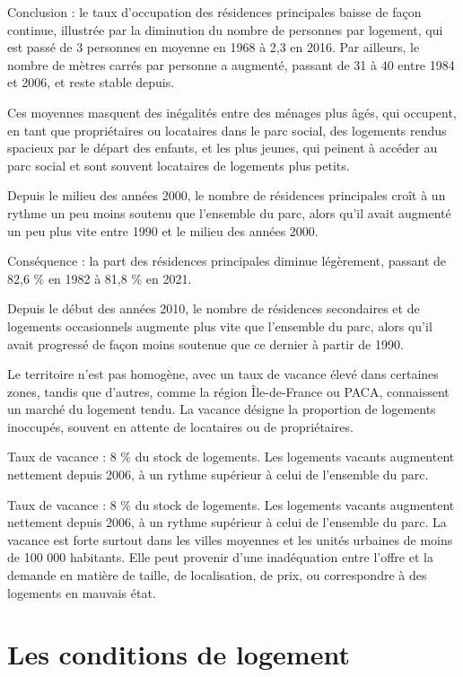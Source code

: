 \documentclass[a4paper, 12pt]{report}
\begin{document}
Conclusion : le taux d’occupation des résidences principales baisse de façon continue, illustrée par la diminution du nombre de personnes par logement, qui est passé de 3 personnes en moyenne en 1968 à 2,3 en 2016. Par ailleurs, le nombre de mètres carrés par personne a augmenté, passant de 31 à 40 entre 1984 et 2006, et reste stable depuis.

Ces moyennes masquent des inégalités entre des ménages plus âgés, qui occupent, en tant que propriétaires ou locataires dans le parc social, des logements rendus spacieux par le départ des enfants, et les plus jeunes, qui peinent à accéder au parc social et sont souvent locataires de logements plus petits.

Depuis le milieu des années 2000, le nombre de résidences principales croît à un rythme un peu moins soutenu que l’ensemble du parc, alors qu'il avait augmenté un peu plus vite entre 1990 et le milieu des années 2000.

Conséquence : la part des résidences principales diminue légèrement, passant de 82,6 \% en 1982 à 81,8 \% en 2021.

Depuis le début des années 2010, le nombre de résidences secondaires et de logements occasionnels augmente plus vite que l’ensemble du parc, alors qu'il avait progressé de façon moins soutenue que ce dernier à partir de 1990.

Le territoire n’est pas homogène, avec un taux de vacance élevé dans certaines zones, tandis que d'autres, comme la région Île-de-France ou PACA, connaissent un marché du logement tendu. La vacance désigne la proportion de logements inoccupés, souvent en attente de locataires ou de propriétaires.

Taux de vacance : 8 \% du stock de logements. Les logements vacants augmentent nettement depuis 2006, à un rythme supérieur à celui de l’ensemble du parc.

Taux de vacance : 8 \% du stock de logements. Les logements vacants augmentent nettement depuis 2006, à un rythme supérieur à celui de l’ensemble du parc. La vacance est forte surtout dans les villes moyennes et les unités urbaines de moins de 100 000 habitants. Elle peut provenir d’une inadéquation entre l’offre et la demande en matière de taille, de localisation, de prix, ou correspondre à des logements en mauvais état.

\section{Les conditions de logement}
\end{document}
